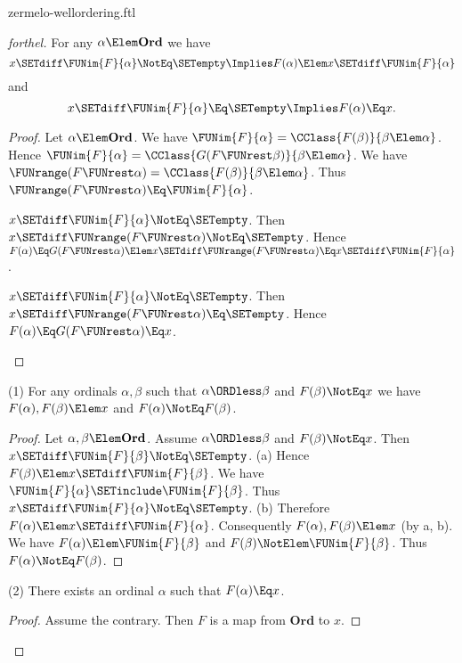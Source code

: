 \documentclass{stex}
\newcommand\Ord{\textbf{Ord}}
\begin{document}
\begin{smodule}{zermelo-wellordering.ftl}
\begin{proof}[forthel]
  For any $\alpha \Elem \Ord$ we have
  \[ x \SETdiff \FUNim{F}{\alpha} \NotEq \SETempty \Implies F(\alpha) \Elem x \SETdiff \FUNim{F}{\alpha} \]
  and
  \[ x \SETdiff \FUNim{F}{\alpha} \Eq \SETempty \Implies F(\alpha) \Eq x. \]
  \begin{proof}
    Let $\alpha \Elem \Ord$.
    We have $\FUNim{F}{\alpha} = \CClass{F(\beta)}{\beta \Elem \alpha}$.
    Hence $\FUNim{F}{\alpha} = \CClass{G(F \FUNrest \beta)}{\beta \Elem \alpha}$.
    We have $\FUNrange(F \FUNrest \alpha) = \CClass{F(\beta)}{\beta \Elem \alpha}$.
    Thus $\FUNrange(F \FUNrest \alpha) \Eq \FUNim{F}{\alpha}$.

    \begin{case}{$x \SETdiff \FUNim{F}{\alpha} \NotEq \SETempty$.}
      Then $x \SETdiff \FUNrange(F \FUNrest \alpha) \NotEq \SETempty$.
      Hence $F(\alpha)
        \Eq G(F \FUNrest \alpha)
        \Elem x \SETdiff \FUNrange(F \FUNrest \alpha)
        \Eq x \SETdiff \FUNim{F}{\alpha}$.
    \end{case}

    \begin{case}{$x \SETdiff \FUNim{F}{\alpha} \NotEq \SETempty$.}
      Then $x \SETdiff \FUNrange(F \FUNrest \alpha) \Eq \SETempty$.
      Hence $F(\alpha)
        \Eq G(F \FUNrest \alpha)
        \Eq x$.
    \end{case}
  \end{proof}

  (1) For any ordinals $\alpha, \beta$ such that $\alpha \ORDless \beta$ and $F(\beta) \NotEq x$ we have $F(\alpha), F(\beta) \Elem x$ and $F(\alpha) \NotEq F(\beta)$.
  \begin{proof}
    Let $\alpha, \beta \Elem \Ord$.
    Assume $\alpha \ORDless \beta$ and $F(\beta) \NotEq x$.
    Then $x \SETdiff \FUNim{F}{\beta} \NotEq \SETempty$.
    (a) Hence $F(\beta) \Elem x \SETdiff \FUNim{F}{\beta}$.
    We have $\FUNim{F}{\alpha} \SETinclude \FUNim{F}{\beta}$.
    Thus $x \SETdiff \FUNim{F}{\alpha} \NotEq \SETempty$.
    (b) Therefore $F(\alpha) \Elem x \SETdiff \FUNim{F}{\alpha}$.
    Consequently $F(\alpha), F(\beta) \Elem x$ (by a, b).
    We have $F(\alpha) \Elem \FUNim{F}{\beta}$ and $F(\beta) \NotElem \FUNim{F}{\beta}$.
    Thus $F(\alpha) \NotEq F(\beta)$.
  \end{proof}

  (2) There exists an ordinal $\alpha$ such that $F(\alpha) \Eq x$.
  \begin{proof}
    Assume the contrary.
    Then $F$ is a map from $\Ord$ to $x$.


\end{proof}
\end{proof}
\end{smodule}
\end{document}
